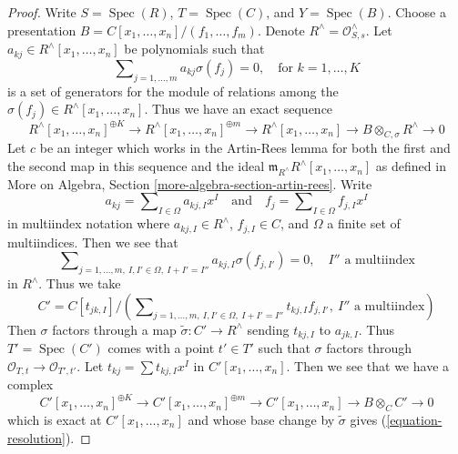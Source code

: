 \documentclass[10pt,a4paper]{amsart}
\theoremstyle{plain}
\theoremstyle{definition}
\theoremstyle{remark}
\numberwithin{equation}{subsection}
\def\Spec{\mathop{\mathrm{Spec}}}
\begin{document}
\begin{proof}
\medskip\noindent
Write $S = \Spec(R)$, $T = \Spec(C)$, and $Y = \Spec(B)$.
Choose a presentation $B = C[x_1, \ldots, x_n]/(f_1, \ldots, f_m)$.
Denote $R^\wedge = \mathcal{O}_{S, s}^\wedge$.
Let $a_{kj} \in R^\wedge[x_1, \ldots, x_n]$ be polynomials
such that
$$
\sum\nolimits_{j = 1, \ldots, m} a_{kj}\sigma(f_j) = 0,\quad
\text{for }k = 1, \ldots, K
$$
is a set of generators for the module of relations among
the $\sigma(f_j) \in R^\wedge[x_1, \ldots, x_n]$.
Thus we have an exact sequence
\begin{equation}
\label{equation-resolution}
R^\wedge[x_1, \ldots, x_n]^{\oplus K} \to
R^\wedge[x_1, \ldots, x_n]^{\oplus m} \to
R^\wedge[x_1, \ldots, x_n] \to B \otimes_{C, \sigma} R^\wedge \to 0
\end{equation}
Let $c$ be an integer which works in the Artin-Rees lemma for
both the first and the second map in this sequence and the ideal
$\mathfrak m_{R^\wedge}R^\wedge[x_1, \ldots, x_n]$ as defined in
More on Algebra, Section \ref{more-algebra-section-artin-rees}.
Write
$$
a_{kj} = \sum\nolimits_{I \in \Omega} a_{kj, I} x^I
\quad\text{and}\quad
f_j = \sum\nolimits_{I \in \Omega} f_{j, I} x^I
$$
in multiindex notation where $a_{kj, I} \in R^\wedge$, $f_{j, I} \in C$,
and $\Omega$ a finite set of multiindices. Then we see that
$$
\sum\nolimits_{j = 1, \ldots, m,\ I, I' \in \Omega,\ I + I' = I''}
a_{kj, I} \sigma(f_{j, I'}) = 0,\quad
I''\text{ a multiindex}
$$
in $R^\wedge$. Thus we take
$$
C' = C[t_{jk, I}]/
\left(
\sum\nolimits_{j = 1, \ldots, m,\ I, I' \in \Omega,\ I + I' = I''}
t_{kj, I} f_{j, I'},\ I''\text{ a multiindex}\right)
$$
Then $\sigma$ factors through a map $\tilde\sigma : C' \to R^\wedge$
sending $t_{kj, I}$ to $a_{jk, I}$.
Thus $T' = \Spec(C')$ comes with a point $t' \in T'$ such that
$\sigma$ factors through $\mathcal{O}_{T, t} \to \mathcal{O}_{T', t'}$.
Let $t_{kj} = \sum t_{kj, I} x^I$ in $C'[x_1, \ldots, x_n]$.
Then we see that we have a complex
\begin{equation}
\label{equation-resolution-new}
C'[x_1, \ldots, x_n]^{\oplus K} \to
C'[x_1, \ldots, x_n]^{\oplus m} \to
C'[x_1, \ldots, x_n] \to B \otimes_C C' \to 0
\end{equation}
which is exact at $C'[x_1, \ldots, x_n]$ and whose base change
by $\tilde\sigma$ gives (\ref{equation-resolution}).


\end{proof}
\end{document}
